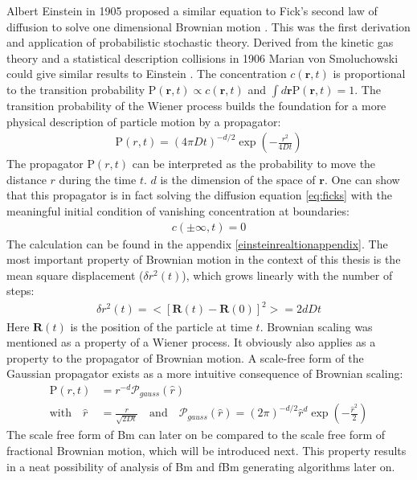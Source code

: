 \documentclass[
  a4paper,BCOR10mm,oneside,
  headsepline,footsepline,%
  fleqn,openbib
]{scrbook}
\begin{document}
Albert Einstein in 1905 proposed a similar equation to Fick's second law of diffusion to solve one dimensional Brownian motion \cite{Einstein1905}. This was the first derivation and application of probabilistic stochastic theory. Derived from the kinetic gas theory and a statistical description collisions in 1906 Marian von Smoluchowski could give similar results to Einstein \cite{vonSmoluchowski1906}. The concentration $c(\bm{r},t)$ is proportional to the transition probability $\mathrm{P}(\bm{r},t) \propto c(\bm{r},t)$ and  $\int d\bm{r}\mathrm{P}(\bm{r},t)=1$. The transition probability of the Wiener process builds the foundation for a more physical description of particle motion by a propagator:
\begin{align}
 \mathrm{P}(r,t)=  \left(4 \pi D t\right)^{-d/2} \exp \left(- \frac{r^2}{4 D t} \right) \label{propagator}
\end{align}
The propagator $\mathrm{P}(r,t)$ can be interpreted as the probability to move the distance $r$ during the time $t$. $d$ is the dimension of the space of $\bm{r}$. One can show that this propagator is in fact solving the diffusion equation \cref{eq:ficks} with the meaningful initial condition of vanishing concentration at boundaries: 
\begin{align}
c(\pm \infty,t)=0
\end{align}
The calculation can be found in the appendix \ref{einsteinrealtionappendix}. The most important property of Brownian motion in the context of this thesis  is the mean square displacement ($\delta r^2(t)$), which grows linearly with the number of steps: 
\begin{align}
\delta r^2(t)=<[\bm{R}(t)-\bm{R}(0)]^2>= 2dDt                                                                                                                                                                                                                                                                                                                                \end{align}
Here $\bm{R}(t)$ is the position of the particle at time $t$.
Brownian scaling was mentioned as a property of a Wiener process. It obviously also applies as a property to the propagator of Brownian motion. A scale-free form of the Gaussian propagator exists as a more intuitive consequence of Brownian scaling: 
\begin{align}
\mathrm{P}(r,t)&= r^{-d} \mathcal{P}_{gauss}(\hat{r}) \\ \text{with} \quad \hat{r} &= \frac{r}{\sqrt{2Dt}} \quad \text{and} \quad \mathcal{P}_{gauss}(\hat{r})= (2 \pi)^{-d/2}  \hat{r}^d \exp \left(- \frac{\hat{r}^2}{2} \right) \label{scalefreeform} 
\end{align}
The scale free form of Bm can later on be compared to the scale free form of fractional Brownian motion, which will be introduced next. This property results in a neat possibility of analysis of Bm and fBm generating algorithms later on.
\end{document}

